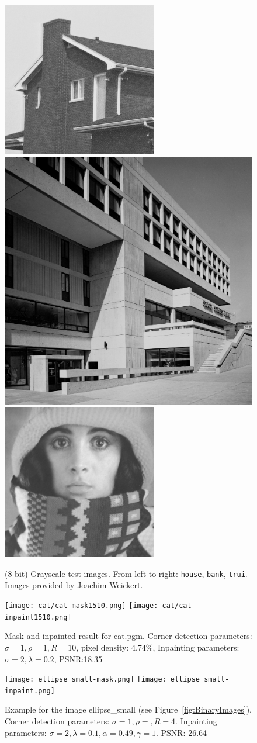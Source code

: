 \begin{figure}[h]
    \centering
    \includegraphics[width=0.3\linewidth]{../../images/grey/house.png}
    \includegraphics[width=0.3\linewidth]{../../images/grey/bank.png}
    \includegraphics[width=0.3\linewidth]{../../images/grey/trui.png}
    \caption{(8-bit) Grayscale test images. From left to right: \texttt{house}, \texttt{bank},
    \texttt{trui}. Images provided by Joachim Weickert.}
\end{figure}
\begin{figure}[h]
    \centering
    \texttt{[image: cat/cat-mask1510.png]}\hspace{0.2cm}
    \texttt{[image: cat/cat-inpaint1510.png]}
    \caption{Mask and inpainted result for cat.pgm. Corner detection parameters:
    $\sigma=1,\rho=1,R=10$, pixel density: 4.74\%, Inpainting parameters: $\sigma=2,\lambda=0.2$,
PSNR:\@18.35}\label{fig:CatExample}
\end{figure}
\begin{figure}[h]
    \centering
    \texttt{[image: ellipse\_small-mask.png]}
    \texttt{[image: ellipse\_small-inpaint.png]}
    \caption{Example for the image ellipse\_small (see Figure~\ref{fig:BinaryImages}). Corner
    detection parameters: $\sigma=1,\rho=,R=4$. Inpainting parameters:
$\sigma=2,\lambda=0.1,\alpha=0.49,\gamma=1$. PSNR\@: 26.64}\label{fig:EllipseSmallExample}
\end{figure}

